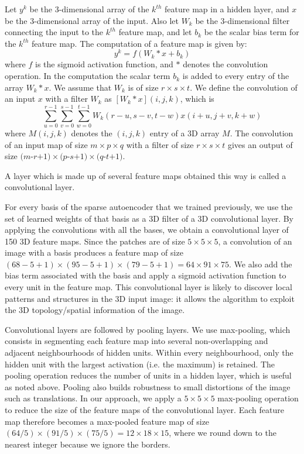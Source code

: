 \documentclass[a4paper,10pt]{article}
\begin{document}
Let $y^{k}$ be the 3-dimensional array of the $k^{th}$ feature map in a hidden layer, and $x$ be the 3-dimensional array of the input. Also let $W_{k}$ be the 3-dimensional filter connecting the input to the $k^{th}$ feature map, and let $b_{k}$ be the scalar bias term for the $k^{th}$ feature map. The computation of a feature map is given by:
\begin{equation}
y^{k} = f(W_{k}*x + b_{k})
\end{equation}
where $f$ is the sigmoid activation function, and $*$ denotes the convolution operation. In the computation the scalar term $b_{k}$ is added to every entry of the array $W_{k}*x$. We assume that $W_{k}$ is of size $r \times s \times t$. We define the convolution of an input $x$ with a filter $W_{k}$ as $[W_{k}*x](i,j,k)$, which is
\begin{equation}
\sum_{u=0}^{r-1}\sum_{v=0}^{s-1}\sum_{w=0}^{t-1}W_{k}(r-u,s-v,t-w) x(i+u,j+v,k+w)
\end{equation}
where $M(i,j,k)$ denotes the $(i,j,k)$ entry of a 3D array $M$. The convolution of an input map of size $\textit{m} \times \textit{p} \times \textit{q}$ with a filter of size $\textit{r} \times \textit{s} \times \textit{t}$ gives an output of size $\textit{(m-r+1)} \times \textit{(p-s+1)} \times \textit{(q-t+1)}$.

A layer which is made up of several feature maps obtained this way is called a convolutional layer.

For every basis of the sparse autoencoder that we trained previously, we use the set of learned weights of that basis as a 3D filter of a 3D convolutional layer. By applying the convolutions with all the bases, we obtain a convolutional layer of 150 3D feature maps. Since the patches are of size $5 \times 5 \times 5$, a convolution of an image with a basis produces a feature map of size $(68-5+1)\times(95-5+1)\times(79-5+1) = 64\times91\times75$. We also add the bias term associated with the basis and apply a sigmoid activation function to every unit in the feature map. This convolutional layer is likely to discover local patterns and structures in the 3D input image: it allows the algorithm to exploit the 3D topology/spatial information of the image.

Convolutional layers are followed by pooling layers. We use max-pooling, which consists in segmenting each feature map into several non-overlapping and adjacent neighbourhoods of hidden units. Within every neighbourhood, only the hidden unit with the largest activation (i.e. the maximum) is retained. The pooling operation reduces the number of units in a hidden layer, which is useful as noted above. Pooling also builds robustness to small distortions of the image such as translations. In our approach, we apply a $5\times5\times5$ max-pooling operation to reduce the size of the feature maps of the convolutional layer. Each feature map therefore becomes a max-pooled feature map of size $(64/5)\times(91/5)\times(75/5) = 12\times18\times15$, where we round down to the nearest integer because we ignore the borders.
\end{document}
